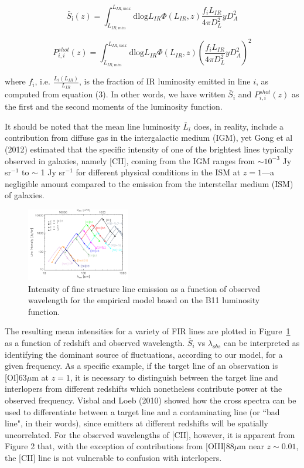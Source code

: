 \documentclass[12pt,preprint]{emulateapj}
\begin{document}
\begin{equation} \label{eq:intensity}
\bar{S}_{\mathrm{i}}(z) = \int_{L_{IR,min}}^{L_{IR,max}} \mathrm{dlog}L_{IR}  \Phi(L_{IR}, z) \frac{f_{i} L_{IR} }{4 \pi D_{L}^2} y D_A^2
\end{equation}

\begin{equation} \label{eq:pshotlum}
P_{i,i}^{shot}(z) = \int_{L_{IR,min}}^{L_{IR,max}} \mathrm{dlog}L_{IR}  \Phi(L_{IR}, z) \left(\frac{f_{i} L_{IR}}{4 \pi D_{L}^2} y D_A^2\right)^2
\end{equation}

where $f_{i}$, i.e. $\frac{L_{i}(L_{IR})}{L_{IR}}$, is the fraction of IR luminosity emitted in line $i$, as computed from equation (3). In other words, we have written $\bar{S}_{i}$ and $P_{i,i}^{shot}(z)$ as the first and the second moments of the luminosity function.

It should be noted that the mean line luminosity $\bar{L}_i$ does, in reality, include a contribution from diffuse gas in the intergalactic medium (IGM), yet Gong et al (2012) estimated that the specific intensity of one of the brightest lines typically observed in galaxies, namely [CII],  coming from the IGM ranges from $\sim 10^{-3}$ Jy sr$^{-1}$ to $\sim$ 1 Jy sr$^{-1}$ for different physical conditions in the ISM at $z = 1$---a negligible amount compared to the emission from the interstellar medium (ISM) of galaxies. 

\begin{figure}[h]
 \centering
 \includegraphics[width=0.4\textwidth]{interloper_intensity_jysr}
\caption{Intensity of fine structure line emission as a function of observed wavelength for the empirical model based on the B11 luminosity function.}
\label{fig:interlopers}
\end{figure}

The resulting mean intensities for a variety of FIR lines are plotted in Figure~\ref{fig:interlopers} as a function of redshift and observed wavelength. $\bar{S}_{i}$ vs $\lambda_{obs}$ can be interpreted as identifying the dominant source of fluctuations, according to our model, for a given frequency. As a specific example, if the target line of an observation is [OI]63$\mu$m at $z = 1$, it is necessary to distinguish between the target line and interlopers from different redshifts which nonetheless contribute power at the observed frequency. Visbal and Loeb (2010) showed how the cross spectra can be used to differentiate between a target line and a contaminating line (or ``bad line", in their words), since emitters at different redshifts will be spatially uncorrelated. For the observed wavelengths of [CII], however, it is apparent from Figure 2 that, with the exception of contributions from [OIII]88$\mu$m near $z \sim 0.01$, the [CII] line is not vulnerable to confusion with interlopers.  
\end{document}

